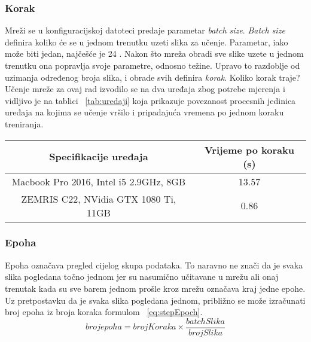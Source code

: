 \subsubsection{Korak}
Mreži se u konfiguracijskoj datoteci predaje parametar \emph{batch size}.
\emph{Batch size} definira koliko će se u jednom trenutku uzeti slika za učenje.
Parametar, iako može biti jedan, najčešće je 24 \cite{tensorflow.org}.
Nakon što mreža obradi sve slike uzete u jednom trenutku ona popravlja svoje parametre, odnosno težine.
Upravo to razdoblje od uzimanja određenog broja slika, i obrade svih definira \emph{korak}.
Koliko korak traje?
Učenje mreže za ovaj rad izvodilo se na dva uređaja zbog potrebe mjerenja i vidljivo je na tablici ~\ref{tab:uredaji} koja prikazuje povezanost procesnih jedinica uređaja na kojima se učenje vršilo i pripadajuća vremena po jednom koraku treniranja.
\begin{center}
	\begin{tabular}{||c c||}
		\hline
		Specifikacije uređaja & Vrijeme po koraku (s) \\ [0.5ex]
		\hline\hline
		Macbook Pro 2016, Intel i5 2.9GHz, 8GB & 13.57 \\
		\hline
		ZEMRIS C22, NVidia GTX 1080 Ti, 11GB & 0.86 \\ [1ex]
		\hline
	\end{tabular}
\label{tab:uredaji}
\end{center}
\subsubsection{Epoha}
Epoha označava pregled cijelog skupa podataka. 
To naravno ne znači da je svaka slika pogledana točno jednom jer su nasumično učitavane u mrežu ali onaj trenutak kada su sve barem jednom prošle kroz mrežu označava kraj jedne epohe.
Uz pretpostavku da je svaka slika pogledana jednom, približno se može izračunati broj epoha iz broja koraka formulom ~\ref{eq:stepEpoch}.
\begin{equation}
	\label{eq:stepEpoch}
	broj epoha = brojKoraka \times \frac{batchSlika}{brojSlika}
\end{equation}
